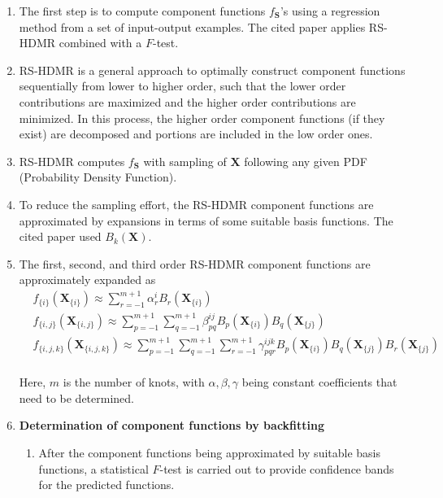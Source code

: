 \begin{enumerate}
	\item The first step is to compute component functions $ f_{\mathbf{S}} $'s using a regression method from a set of input-output examples. The cited paper applies RS-HDMR combined with a $ F $-test.
	
	\item RS-HDMR is a general approach to optimally construct component functions sequentially from lower to higher order, such that the lower order contributions are maximized and the higher order contributions are minimized. In this process, the higher order component functions (if they exist) are decomposed and portions are included in the low order ones.
	
	\item RS-HDMR computes $ f_{\mathbf{S}} $ with sampling of $ \mathbf{X} $ following any given PDF (Probability Density Function). 
	
	\item To reduce the sampling effort, the RS-HDMR component functions are approximated by expansions in terms of some suitable basis functions. The cited paper used  $ B_k(\mathbf{X}) $. 
	
	
	\item The first, second, and third order RS-HDMR component functions are approximately expanded as 
	\begin{align*}
	&f_{\{i\}} (\mathbf{X}_{\{i\}}) \approx \sum_{r=-1}^{m+1}\alpha_r^iB_r(\mathbf{X}_{\{i\}})\\
	&f_{\{i, j\}} (\mathbf{X}_{\{i, j\}}) \approx \sum_{p=-1}^{m+1}\sum_{q=-1}^{m+1}\beta_{pq}^{ij}B_p(\mathbf{X}_{\{i\}})B_q(\mathbf{X}_{\{j\}})\\
	&f_{\{i, j, k\}} (\mathbf{X}_{\{i, j, k\}}) \approx \sum_{p=-1}^{m+1}\sum_{q=-1}^{m+1}\sum_{r=-1}^{m+1}\gamma_{pqr}^{ijk}B_p(\mathbf{X}_{\{i\}})B_q(\mathbf{X}_{\{j\}})B_r(\mathbf{X}_{\{j\}})\\
	\end{align*}
	
	Here, $ m $ is the number of knots, with $ \alpha, \beta, \gamma $ being constant coefficients that need to be determined. 
	
	\item \textbf{Determination of component functions by backfitting} 
	
	\begin{enumerate}
		\item After the component functions being approximated by suitable basis functions, a statistical $ F $-test is carried out to provide confidence bands for the predicted functions. 
		

\end{enumerate}
\end{enumerate}
